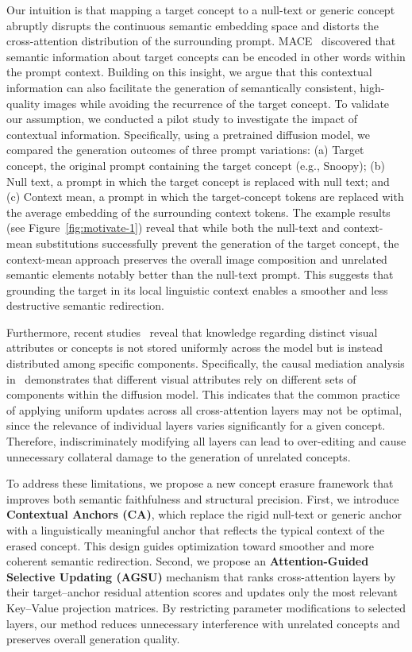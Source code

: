 \documentclass[letterpaper]{article} %
\begin{document}
Our intuition is that mapping a target concept to a null-text or generic concept abruptly disrupts the continuous semantic embedding space and distorts the cross-attention distribution of the surrounding prompt. MACE~\cite{MACE} discovered that semantic information about target concepts can be encoded in other words within the prompt context. Building on this insight, we argue that this contextual information can also facilitate the generation of semantically consistent, high-quality images while avoiding the recurrence of the target concept. To validate our assumption, we conducted a pilot study to investigate the impact of contextual information. Specifically, using a pretrained diffusion model, we compared the generation outcomes of three prompt variations: (a) Target concept, the original prompt containing the target concept (e.g., Snoopy); (b) Null text, a prompt in which the target concept is replaced with null text; and (c) Context mean, a prompt in which the target-concept tokens are replaced with the average embedding of the surrounding context tokens. The example results (see Figure~\ref{fig:motivate-1}) reveal that while both the null-text and context-mean substitutions successfully prevent the generation of the target concept, the context-mean approach preserves the overall image composition and unrelated semantic elements notably better than the null-text prompt. This suggests that grounding the target in its local linguistic context enables a smoother and less destructive semantic redirection.

Furthermore, recent studies~\cite{localize,HiRM} reveal that knowledge regarding distinct visual attributes or concepts is not stored uniformly across the model but is instead distributed among specific components. Specifically, the causal mediation analysis in~\cite{localize} demonstrates that different visual attributes rely on different sets of components within the diffusion model. This indicates that the common practice of applying uniform updates across all cross-attention layers may not be optimal, since the relevance of individual layers varies significantly for a given concept. Therefore, indiscriminately modifying all layers can lead to over-editing and cause unnecessary collateral damage to the generation of unrelated concepts.

To address these limitations, we propose a new concept erasure framework that improves both semantic faithfulness and structural precision. First, we introduce \textbf{Contextual Anchors (CA)}, which replace the rigid null-text or generic anchor with a linguistically meaningful anchor that reflects the typical context of the erased concept. This design guides optimization toward smoother and more coherent semantic redirection. Second, we propose an \textbf{Attention-Guided Selective Updating (AGSU)} mechanism that ranks cross-attention layers by their target--anchor residual attention scores and updates only the most relevant Key--Value projection matrices. By restricting parameter modifications to selected layers, our method reduces unnecessary interference with unrelated concepts and preserves overall generation quality.
\end{document}
